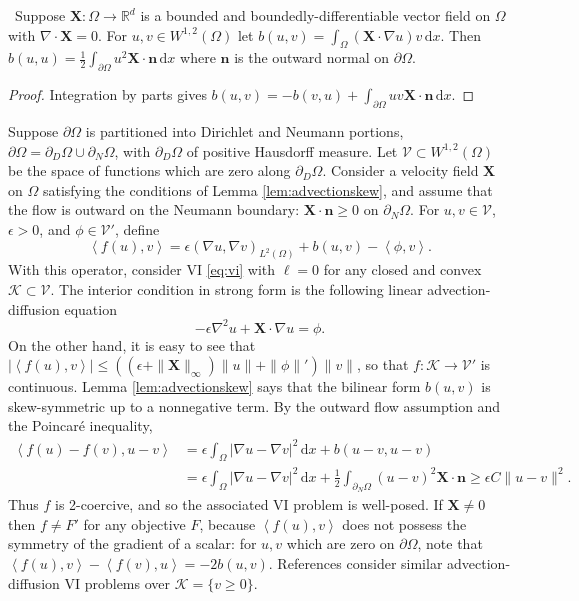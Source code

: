 \documentclass[review,hidelinks,onefignum,onetabnum]{siamart220329}
\newcommand{\eps}{\epsilon}
\newcommand{\RR}{\mathbb{R}}
\newcommand{\grad}{\nabla}
\newcommand{\Div}{\nabla\cdot}
\newcommand{\bn}{\mathbf{n}}
\newcommand{\bX}{\mathbf{X}}
\newcommand{\cK}{\mathcal{K}}
\newcommand{\cV}{\mathcal{V}}
\newcommand{\ip}[2]{\left<#1,#2\right>}
\newcommand{\dx}{\, \mathrm{d}x}
\begin{document}
\begin{lemma}  \label{lem:advectionskew}  \cite{Elmanetal2014}\,  Suppose $\bX :\Omega \to \RR^d$ is a bounded and boundedly-differentiable vector field on $\Omega$ with $\Div \bX=0$.  For $u,v \in W^{1,2}(\Omega)$ let $b(u,v) = \int_\Omega (\bX \cdot \grad u) v\dx$.  Then $b(u,u) = \frac{1}{2} \int_{\partial \Omega} u^2 \bX\cdot \bn\dx$ where $\bn$ is the outward normal on $\partial \Omega$.
\end{lemma}

\begin{proof}
Integration by parts gives $b(u,v) = - b(v,u) + \int_{\partial \Omega} uv \bX\cdot \bn\dx$.
\end{proof}

\begin{example}  \label{ex:advectiondiffusion}  Suppose $\partial\Omega$ is partitioned into Dirichlet and Neumann portions, $\partial\Omega = \partial_D\Omega \cup \partial_N\Omega$, with $\partial_D\Omega$ of positive Hausdorff measure.  Let $\cV \subset W^{1,2}(\Omega)$ be the space of functions which are zero along $\partial_D\Omega$.  Consider a velocity field $\bX$ on $\Omega$ satisfying the conditions of Lemma \ref{lem:advectionskew}, and assume that the flow is outward on the Neumann boundary: $\bX \cdot \bn \ge 0$ on $\partial_N\Omega$.  For $u,v \in \cV$, $\eps>0$, and $\phi \in \cV'$, define
\begin{equation}
\ip{f(u)}{v} = \eps \left(\grad u, \grad v\right)_{L^2(\Omega)} + b(u,v) - \ip{\phi}{v}. \label{eq:advectiondiffusion}
\end{equation}
With this operator, consider VI \eqref{eq:vi} with $\ell = 0$ for any closed and convex $\cK \subset \cV$. The interior condition in strong form is the following linear advection-diffusion equation
\begin{equation}
-\eps \grad^2 u + \bX\cdot \grad u = \phi.
\label{eq:advectiondiffusionstrong}
\end{equation}
On the other hand, it is easy to see that $|\ip{f(u)}{v}| \le \left((\eps + \|\bX\|_\infty) \|u\| + \|\phi\|'\right) \|v\|$, so that $f:\cK \to \cV'$ is continuous.  Lemma \ref{lem:advectionskew} says that the bilinear form $b(u,v)$ is skew-symmetric up to a nonnegative term.  By the outward flow assumption and the Poincar\'e inequality,
\begin{align*}
\ip{f(u)-f(v)}{u-v} &= \eps \int_\Omega |\grad u - \grad v|^2\dx + b(u-v,u-v) \\
                    &= \eps \int_\Omega |\grad u - \grad v|^2\dx + \frac{1}{2} \int_{\partial_N\Omega} (u-v)^2 \bX\cdot\bn \ge \eps C \|u-v\|^2.
\end{align*}
Thus $f$ is 2-coercive, and so the associated VI problem is well-posed. If $\bX \ne 0$ then $f\ne F'$ for any objective $F$, because $\ip{f(u)}{v}$ does not possess the symmetry of the gradient of a scalar: for $u,v$ which are zero on $\partial \Omega$, note that $\ip{f(u)}{v} - \ip{f(v)}{u} = -2 b(u,v)$.  References \cite{Bueler2021conservation,ChangNakshatrala2017} consider similar advection-diffusion VI problems over $\cK = \{v\ge 0\}$. \end{example}
\end{document}
